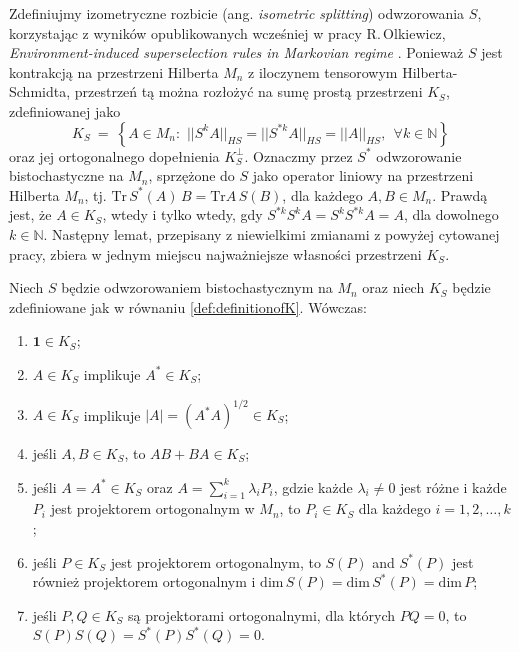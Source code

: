 {Zdefiniujmy izometryczne rozbicie (ang. \emph{isometric splitting})
odwzorowania $S$, korzystając z wyników opublikowanych wcześniej w pracy
R.\,Olkiewicz, \emph{Environment-induced superselection rules in Markovian regime}
\cite{olkiewicz1999environment}.
Ponieważ $S$ jest kontrakcją na przestrzeni Hilberta $M_{n}$
z iloczynem tensorowym Hilberta-Schmidta,
przestrzeń tą można rozłożyć na sumę prostą przestrzeni $K_{S}$,
zdefiniowanej jako
\begin{equation}
\label{def:definitionofK}
    K_{S} \: = \: \left\{
        A \in M_{n}: \,\,
            || S^{k} A ||_{HS} = || S^{* k} A ||_{HS} = || A ||_{HS}, \:\:
            \forall k \in \mathbb{N}
        \right\}
\end{equation}
oraz jej ortogonalnego dopełnienia $K_{S}^{\perp}$.
Oznaczmy przez $S^{*}$ odwzorowanie bistochastyczne na $M_{n}$,
sprzężone do $S$ jako operator liniowy na przestrzeni Hilberta $M_{n}$,
tj. $\text{Tr}\, S^{*} (A)\, B = \text{Tr} A \, S(B)$,
dla każdego $A, B \in M_{n}$.
Prawdą jest, że $A \in K_{S}$,
wtedy i tylko wtedy, gdy
$S^{* k} S^{k} A = S^{k} S^{* k} A = A$,
dla dowolnego $k \in \mathbb{N}$.
Następny lemat, przepisany z niewielkimi zmianami z
powyżej cytowanej pracy,
zbiera w jednym miejscu najważniejsze własności przestrzeni $K_{S}$.

\begin{Lemma}
\label{lem:propertiesofK}
Niech $S$ będzie odwzorowaniem bistochastycznym na $M_{n}$
oraz niech $K_{S}$ będzie zdefiniowane jak w równaniu
\eqref{def:definitionofK}.
Wówczas:
\let \oldlabelenumi \labelenumi
\renewcommand{\labelenumi}{\alph{enumi})}
\begin{enumerate}
\item $\mathbf{1} \in K_{S}$;
\item $A \in K_{S}$ implikuje $A^{*} \in K_{S}$;
\item  $A  \in K_{S}$ implikuje
$|A| = (A^{*}A)^{1/2} \in K_{S}$;
\item jeśli $A, B \in K_{S}$, to $AB + BA \in K_{S}$;
\item jeśli $A = A^{*} \in K_{S}$ oraz $A = \sum_{i=1}^{k} \lambda_{i} P_{i}$,
gdzie każde $\lambda_{i} \neq 0$ jest różne i
każde $P_{i}$ jest projektorem ortogonalnym w $M_{n}$,
to $P_{i} \in K_{S}$ dla każdego $i = 1,2,\ldots,k$;
\item jeśli $P \in K_{S}$ jest projektorem ortogonalnym,
to $S(P)$ and $S^{*}(P)$ jest również projektorem ortogonalnym i
$\mathrm{dim} \, S(P) = \mathrm{dim} \, S^{*}(P) = \mathrm{dim} \, P$;
\item jeśli $P, Q \in K_{S}$ są projektorami ortogonalnymi, dla których
$P Q = 0$,
to $S(P) S(Q) = S^{*}(P) S^{*}(Q) = 0$.
\end{enumerate}
\let \labelenumi \oldlabelenumi
\end{Lemma}

}
